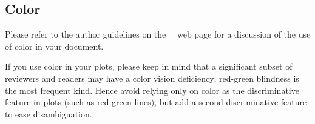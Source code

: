 \subsection{Color}

Please refer to the author guidelines on the \confName\ \confYear\ web page for a discussion of the use of color in your document.

If you use color in your plots, please keep in mind that a significant subset of reviewers and readers may have a color vision deficiency; red-green blindness is the most frequent kind.
Hence avoid relying only on color as the discriminative feature in plots (such as red \vs green lines), but add a second discriminative feature to ease disambiguation.